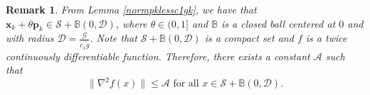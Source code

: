 \documentclass{elsarticle}
\newtheorem{remark}{Remark}
\numberwithin{equation}{section}
\begin{document}
{%



\begin{remark}
    From Lemma \ref{normpklessc1gk}, we have that $\mathbf{x}_{k}+\theta \mathbf{p}_{k}\in \mathcal{S}+\mathbb{B}(0,\mathcal{D})$, where $\theta\in(0,1]$ and $\mathbb{B}$ is a closed ball centered at $0$ and with radius $\mathcal{D}=\frac{\mathcal{G}}{ c_1\tilde g}$. Note that $\mathcal{S}+\mathbb{B}(0,\mathcal{D})$ is a compact set and $f$ is  a twice continuously differentiable function. Therefore, there exists a constant $\mathcal{A}$ such that 
    \begin{equation}\label{steplengthpf3}
        \lVert \nabla^{2} f(x)\rVert \leq \mathcal{A} \text{ for all } x\in \mathcal{S}+\mathbb{B}(0,\mathcal{D}).
    \end{equation}
\end{remark}

}
\end{document}
